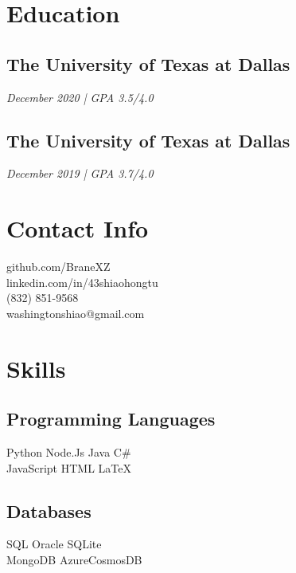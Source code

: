 \documentclass{fortythree_resume}
\begin{document}
\sectionsep

\begin{minipage}[t]{0.33\textwidth}

\section{Education}
\subsection{The University of Texas at Dallas}
\emph{December 2020 | GPA 3.5/4.0}
\subsection{The University of Texas at Dallas}
\emph{December 2019 | GPA 3.7/4.0}
\sectionsep

\section{Contact Info}
\faGithub \hspace{0em} github.com/BraneXZ\\
\faLinkedinSquare \hspace{0em} linkedin.com/in/43shiaohongtu\\
\faMobile \hspace{.2em} (832) 851-9568\\
\faEnvelope \hspace{0em} washingtonshiao@gmail.com
\sectionsep

\section{Skills}
\subsection{Programming Languages}
Python \textbullet{} Node.Js \textbullet{} Java \textbullet{} C\# \\
JavaScript \textbullet{} HTML \textbullet{} \LaTeX
\subsection{Databases}
SQL \textbullet{} Oracle \textbullet{} SQLite\\ 
MongoDB \textbullet{} AzureCosmosDB

\end{minipage}
\end{document}
